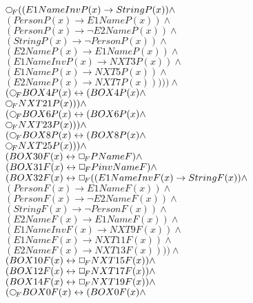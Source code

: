 \documentclass[a4paper,10pt]{article}
\begin{document}
 $  \Rnext ((E1NameInvP(x) \rightarrow StringP(x)) \land $ \\ 
 $ (PersonP(x) \rightarrow E1NameP(x)) \land $ \\ 
 $ (PersonP(x) \rightarrow  \lnot E2NameP(x)) \land $ \\ 
 $ (StringP(x) \rightarrow  \lnot PersonP(x)) \land $ \\ 
 $ (E2NameP(x) \rightarrow E1NameP(x)) \land $ \\ 
 $ (E1NameInvP(x) \rightarrow NXT3P(x)) \land $ \\ 
 $ (E1NameP(x) \rightarrow NXT5P(x)) \land $ \\ 
 $ (E2NameP(x) \rightarrow NXT7P(x))))) \land $ \\ 
 $ ( \Rnext BOX4P(x) \leftrightarrow (BOX4P(x) \land $ \\ 
 $  \Rnext NXT21P(x))) \land $ \\ 
 $ ( \Rnext BOX6P(x) \leftrightarrow (BOX6P(x) \land $ \\ 
 $  \Rnext NXT23P(x))) \land $ \\ 
 $ ( \Rnext BOX8P(x) \leftrightarrow (BOX8P(x) \land $ \\ 
 $  \Rnext NXT25P(x))) \land $ \\ 
 $ (BOX30F(x) \leftrightarrow  \Box_{\!F} PNameF) \land $ \\ 
 $ (BOX31F(x) \leftrightarrow  \Box_{\!F} PinvNameF) \land $ \\ 
 $ (BOX32F(x) \leftrightarrow  \Box_{\!F} ((E1NameInvF(x) \rightarrow StringF(x)) \land $ \\ 
 $ (PersonF(x) \rightarrow E1NameF(x)) \land $ \\ 
 $ (PersonF(x) \rightarrow  \lnot E2NameF(x)) \land $ \\ 
 $ (StringF(x) \rightarrow  \lnot PersonF(x)) \land $ \\ 
 $ (E2NameF(x) \rightarrow E1NameF(x)) \land $ \\ 
 $ (E1NameInvF(x) \rightarrow NXT9F(x)) \land $ \\ 
 $ (E1NameF(x) \rightarrow NXT11F(x)) \land $ \\ 
 $ (E2NameF(x) \rightarrow NXT13F(x)))) \land $ \\ 
 $ (BOX10F(x) \leftrightarrow  \Box_{\!F} NXT15F(x)) \land $ \\ 
 $ (BOX12F(x) \leftrightarrow  \Box_{\!F} NXT17F(x)) \land $ \\ 
 $ (BOX14F(x) \leftrightarrow  \Box_{\!F} NXT19F(x)) \land $ \\ 
 $ ( \Rnext BOX0F(x) \leftrightarrow (BOX0F(x) \land $ \\ 
\end{document}
